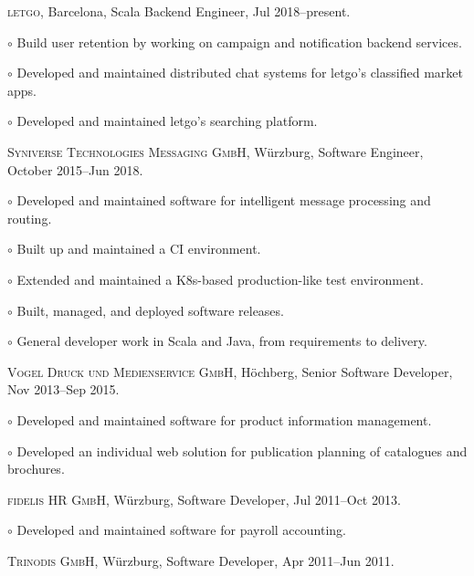 \documentclass[letterpaper]{article}
\renewenvironment{itemize}{
  \begin{list}{}{
    \setlength{\leftmargin}{1.5em}
  }
}{
  \end{list}
}
\newenvironment{no-indent-itemize}{
  \begin{list}{}{
    \setlength{\leftmargin}{0em}
  }
}{
  \end{list}
}
\def\bullet{$\circ$\xspace}
\begin{document}
\begin{no-indent-itemize}
  \item \textsc{letgo}, Barcelona, Scala Backend Engineer, Jul 2018--present.
  \begin{itemize}
    \item\bullet Build user retention by working on campaign and notification backend services.
    \item\bullet Developed and maintained distributed chat systems for letgo's classified market apps.
    \item\bullet Developed and maintained letgo's searching platform.
  \end{itemize}
  \item \textsc{Syniverse Technologies Messaging GmbH}, Würzburg, Software Engineer, October 2015--Jun 2018.
  \begin{itemize}
    \item\bullet Developed and maintained software for intelligent message processing and routing.
    \item\bullet Built up and maintained a CI environment.
    \item\bullet Extended and maintained a K8s-based production-like test environment.
    \item\bullet Built, managed, and deployed software releases.
    \item\bullet General developer work in Scala and Java, from requirements to delivery.
  \end{itemize}
  \item \textsc{Vogel Druck und Medienservice GmbH}, Höchberg, Senior Software Developer, Nov 2013--Sep 2015.
  \begin{itemize}
    \item\bullet Developed and maintained software for product information management.
    \item\bullet Developed an individual web solution for publication planning of catalogues and brochures.
  \end{itemize}
  \item \textsc{fidelis HR GmbH}, Würzburg, Software Developer, Jul 2011--Oct 2013. 
  \begin{itemize}
    \item\bullet Developed and maintained software for payroll accounting.
  \end{itemize}
  \item \textsc{Trinodis GmbH}, Würzburg, Software Developer, Apr 2011--Jun 2011. 
  \begin{itemize}

\end{itemize}
\end{no-indent-itemize}
\end{document}
